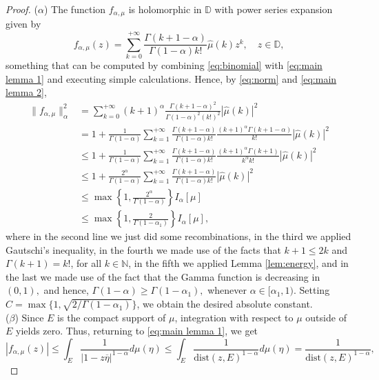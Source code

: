 \documentclass[12pt]{amsart}
\theoremstyle{definition}\newtheorem{remark}[theorem]{Remark}
\theoremstyle{definition}\newtheorem{example}[theorem]{Example}
\theoremstyle{definition}\newtheorem{definition}{Definition}
\numberwithin{equation}{section}
\newcommand\DD{{\mathbb D}}
\begin{document}
\begin{proof}
\textup{($\alpha$)} The function $f_{\alpha,\mu}$ is holomorphic in $\DD$ with power series expansion given by
\begin{equation}\label{eq:main lemma 2}
    f_{\alpha,\mu}(z)=\sum_{k=0}^{+\infty}\frac{\Gamma(k+1-\alpha)}{\Gamma(1-\alpha)k!}\hat{\mu}(k)z^k, \quad z\in \DD,
\end{equation}
something that can be computed by combining \eqref{eq:binomial} with \eqref{eq:main lemma 1} and executing simple calculations. Hence, by \eqref{eq:norm} and \eqref{eq:main lemma 2},
\begin{align*}
\|f_{\alpha,\mu}\|_\alpha^2 &= \sum_{k=0}^{+\infty}(k+1)^\alpha\frac{\Gamma(k+1-\alpha)^2}{\Gamma(1-\alpha)^2(k!)^2}|\hat{\mu}(k)|^2 \\
&=1+\frac{1}{\Gamma(1-\alpha)}\sum_{k=1}^{+\infty}\frac{\Gamma(k+1-\alpha)}{\Gamma(1-\alpha)k!}\frac{(k+1)^\alpha\Gamma(k+1-\alpha)}{k!}|\hat{\mu}(k)|^2\\
&\le 1+\frac{1}{\Gamma(1-\alpha)}\sum_{k=1}^{+\infty}\frac{\Gamma(k+1-\alpha)}{\Gamma(1-\alpha)k!}\frac{(k+1)^\alpha\Gamma(k+1)}{k^\alpha k!}|\hat{\mu}(k)|^2\\
&\le 1+\frac{2^\alpha}{\Gamma(1-\alpha)}\sum_{k=1}^{+\infty}\frac{\Gamma(k+1-\alpha)}{\Gamma(1-\alpha)k!}|\hat{\mu}(k)|^2\\
&\le \max\left\{1,\frac{2^\alpha}{\Gamma(1-\alpha)}\right\}I_\alpha[\mu]\\
&\le \max\left\{1,\frac{2}{\Gamma(1-\alpha_1)}\right\}I_\alpha[\mu],
\end{align*}
where in the second line we just did some recombinations, in the third we applied Gautschi's inequality, in the fourth we made use of the facts that $k+1\le 2k$ and $\Gamma(k+1)=k!$, for all $k\in\mathbb{N}$, in the fifth we applied Lemma \ref{lem:energy}, and in the last we made use of the fact that the Gamma function is decreasing in $(0,1),$ and hence, $\Gamma(1-\alpha)\ge\Gamma(1-\alpha_1),$ whenever $\alpha\in[\alpha_1,1)$. Setting $C=\max\{1,\sqrt{2/\Gamma(1-\alpha_1)}\}$, we obtain the desired absolute constant.\\[2pt]
\textup{($\beta$)} Since $E$ is the compact support of $\mu$, integration with respect to $\mu$ outside of $E$ yields zero. Thus, returning to \eqref{eq:main lemma 1}, we get
\begin{equation*}
|f_{\alpha,\mu}(z)|\leq\int_{E}\frac{1}{|1-z\overline{\eta}|^{1-\alpha}}d\mu(\eta)
\leq \int_{E}\frac{1}{\textrm{dist}(z,E)^{1-\alpha}}d\mu(\eta)
=\frac{1}{\textrm{dist}(z,E)^{1-\alpha}},

\end{equation*}
\end{proof}
\end{document}
